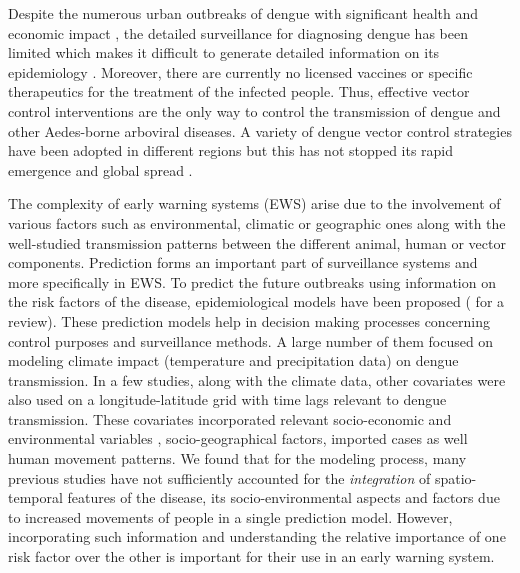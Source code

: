 \documentclass{bmcart}
\begin{document}
Despite the numerous urban outbreaks of dengue with significant health and economic impact \cite{gubler2002epidemic,gubler2004cities,anuradha19981996,vaughn2000invited}, the detailed surveillance for diagnosing dengue has been limited which makes it difficult to generate detailed information on its epidemiology \cite{ooi2009dengue,guzman2004dengue}. Moreover, there are currently no licensed vaccines or specific therapeutics for the treatment of the infected people. Thus, effective vector control interventions are the only way to control the transmission of dengue and other Aedes-borne arboviral diseases. A variety of dengue vector control strategies \cite{wilder2012denguetools} have been adopted in different regions\cite{erlanger2008effect,horstick2010dengue,vanlerberghe2009community,luz2011dengue} but this has not stopped its rapid emergence and global spread \cite{tatem2006global}.

The complexity of early warning systems (EWS) arise due to the involvement of various factors such as environmental, climatic or geographic ones along with the well-studied transmission patterns between the different animal, human or vector components. Prediction forms an important part of surveillance systems and more specifically in EWS. To predict the future outbreaks using information on the risk factors of the disease, epidemiological models have been proposed (\cite{racloz2012surveillance} for a review). These prediction models help in decision making processes concerning control purposes and surveillance methods. A large number of them \cite{degallier2010toward, naish2014climate, hii2012forecast} focused on modeling climate impact (temperature and precipitation data) on dengue transmission. In a few studies, along with the climate data, other covariates were also used on a longitude-latitude grid with time lags relevant to dengue transmission. These covariates incorporated relevant socio-economic and environmental variables \cite{lowe2011spatio, banu2011dengue}, socio-geographical factors\cite{toledo2011evidence, tipayamongkholgul2011socio}, imported cases\cite{shang2010role, sang2015predicting} as well human movement patterns\cite{stoddard2013house, reiner2014socially}. We found that for the modeling process, many previous studies have not sufficiently accounted for the \textit{integration} of spatio-temporal features of the disease, its socio-environmental aspects and factors due to increased movements of people in a single prediction model. However, incorporating such information and understanding the relative importance of one risk factor over the other is important for their use in an early warning system.
\end{document}
